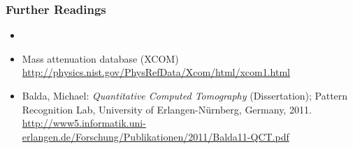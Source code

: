 \begin{frame}
    \frametitle{Further Readings}
    \begin{itemize}
        \setlength\itemsep{0.4cm}

        \item {}

        \item Mass attenuation database (XCOM) \\
              {\large{\url{http://physics.nist.gov/PhysRefData/Xcom/html/xcom1.html}}}
        \item Balda, Michael: \textit{Quantitative Computed Tomography} (Dissertation); Pattern Recognition Lab, University of Erlangen-Nürnberg, Germany, 2011. \\
              {\large{\url{http://www5.informatik.uni-erlangen.de/Forschung/Publikationen/2011/Balda11-QCT.pdf}}}


    \end{itemize}
\end{frame}






